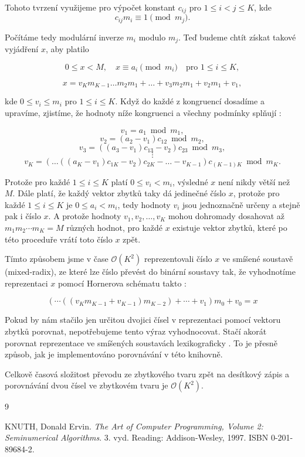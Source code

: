 \documentclass[titlepage]{article}
\begin{document}
Tohoto tvrzení využijeme pro výpočet konstant $c_{ij}$ pro $1\le i<j\le K$, kde
$$c_{ij} m_i \equiv 1 \pmod{m_j}.$$  

Počítáme tedy modulární inverze $m_i$ modulo $m_j$. Teď budeme chtít získat
takové vyjádření $x$, aby platilo

$$
0 \leq x<M, \quad x \equiv a_i \pmod{m_{i}} \quad \text{pro } 1 \le i \le K,
$$  

$$
x=v_K m_{K-1} \dots m_2 m_1 + \dots + v_3 m_2 m_1 +v_2 m_1 +v_1,
$$

kde $0 \leq v_i \leq m_i$ pro $1 \leq i \leq K$. Když do každé z kongruencí
dosadíme a upravíme, zjistíme, že hodnoty níže kongruenci a všechny podmínky
splňují \cite{knuth_taocp2}:

$$v_{1} = a_{1}\bmod m_{1},$$
$$v_{2} = (a_{2}-v_{1})c_{12}\bmod m_{2},$$
$$v_{3} = ((a_{3}-v_{1})c_{13}-v_{2})c_{23}\bmod m_{3},$$  
$$\vdots$$
$$v_{K} = (\dots((a_{K}-v_{1})c_{1K}-v_{2})c_{2K}-\dots-v_{K-1})c_{(K-1)K}\bmod m_{K}.$$  

Protože pro každé $1 \leq i \leq K$ platí $0 \leq v_i < m_i$, výsledné $x$ není
nikdy větší než $M$. Dále platí, že každý vektor zbytků taky dá jedinečné číslo
$x$, protože pro každé $1 \leq i \leq K$ je $0 \leq a_i < m_i$, tedy hodnoty
$v_i$ jsou jednoznačně určeny a stejně pak i číslo $x$. A protože hodnoty $v_1,
v_2, \dots, v_K$ mohou dohromady dosahovat až $m_1 m_2 \cdots m_K = M$ různých
hodnot, pro každé $x$ existuje vektor zbytků, které po této proceduře vrátí
toto číslo $x$ zpět.

Tímto způsobem jsme v čase $\mathcal{O}(K^2)$ reprezentovali číslo $x$ ve
smíšené soustavě (mixed-radix), ze které lze číslo převést do binární soustavy
tak, že vyhodnotíme reprezentaci $x$ pomocí Hornerova schématu takto
\cite{knuth_taocp2}:

$$
(\cdots ((v_K m_{K-1} + v_{K-1}) m_{K-2}) + \cdots + v_1) m_0 + v_0 = x
$$

Pokud by nám stačilo jen určitou dvojici čísel v reprezentaci pomocí vektoru
zbytků porovnat, nepotřebujeme tento výraz vyhodnocovat. Stačí akorát porovnat
reprezentace ve smíšených soustavách lexikograficky \cite{knuth_taocp2}. To je
přesně způsob, jak je implementováno porovnávání v této knihovně.

Celkově časová složitost převodu ze zbytkového tvaru zpět na desítkový zápis a
porovnávání dvou čísel ve zbytkovém tvaru je $\mathcal{O}(K^2)$.

\clearpage
\begin{thebibliography}{9}

KNUTH, Donald Ervin. \textit{The Art of Computer Programming, Volume 2: Seminumerical Algorithms}. 3. vyd. Reading: Addison-Wesley, 1997. ISBN 0-201-89684-2.

\end{thebibliography}
\end{document}
